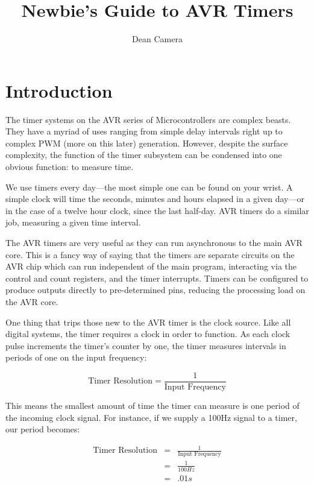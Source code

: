 \documentclass[a4paper,oneside,notitlepage]{book}
\begin{document}
\title{Newbie's Guide to AVR Timers}
\author{Dean Camera}

\maketitle

\tableofcontents
\cleardoublepage


\label{chp:Intro}
\chapter{Introduction}
The timer systems on the AVR series of Microcontrollers are complex beasts. They have a myriad of uses ranging from simple delay intervals right up to complex PWM (more on this later) generation. However, despite the surface complexity, the function of the timer subsystem can be condensed into one obvious function: to measure time.

We use timers every day---the most simple one can be found on your wrist. A simple clock will time the seconds, minutes and hours elapsed in a given day---or in the case of a twelve hour clock, since the last half-day. AVR timers do a similar job, measuring a given time interval.

The AVR timers are very useful as they can run asynchronous to the main AVR core. This is a fancy way of saying that the timers are separate circuits on the AVR chip which can run independent of the main program, interacting via the control and count registers, and the timer interrupts. Timers can be configured to produce outputs directly to pre-determined pins, reducing the processing load on the AVR core.

One thing that trips those new to the AVR timer is the clock source. Like all digital systems, the timer requires a clock in order to function. As each clock pulse increments the timer's counter by one, the timer measures intervals in periods of one on the input frequency: 

\begin{displaymath}
	\text{Timer Resolution} = \frac{1}{\text{Input Frequency}}
\end{displaymath}

This means the smallest amount of time the timer can measure is one period of the incoming clock signal. For instance, if we supply a 100Hz signal to a timer, our period becomes:

\begin{displaymath}
\begin{array}{rcl}
	\text{Timer Resolution} & = & \frac{1}{\text{Input Frequency}} \\
	                        & = & \frac{1}{100 Hz} \\
	                        & = & .01s
\end{array}
\end{displaymath}
\end{document}
